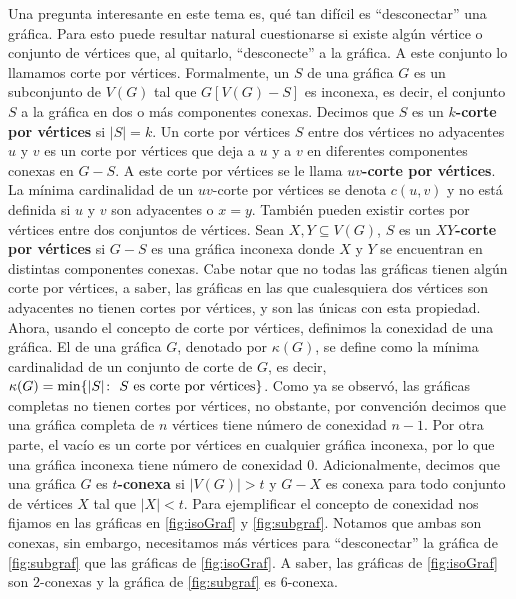 Una pregunta interesante en este tema es, qu\'e tan dif\'icil es ``desconectar''
una gr\'afica. Para esto puede resultar natural cuestionarse si existe alg\'un
v\'ertice o conjunto de v\'ertices que, al quitarlo, ``desconecte'' a la
gr\'afica. A este conjunto lo llamamos corte por v\'ertices. Formalmente, un
 $S$ de una gr\'afica $G$
es un subconjunto de $V(G)$ tal que $G[V(G)-S]$ es inconexa, es decir, el
conjunto $S$  a la gr\'afica en dos o m\'as componentes conexas.
Decimos que $S$ es un $k$\textbf{-corte por v\'ertices} si $|S|=k$. Un corte
por v\'ertices $S$ entre dos v\'ertices no adyacentes $u$ y $v$ es un corte por
v\'ertices que deja a $u$ y a $v$ en diferentes componentes conexas en $G-S$. A
este corte por v\'ertices se le llama $uv$\textbf{-corte por
v\'ertices}. La m\'inima cardinalidad de un $uv$-corte por v\'ertices se denota
$c(u,v)$ y no est\'a definida si $u$ y $v$ son adyacentes o $x=y$. Tambi\'en
pueden existir cortes por v\'ertices entre dos conjuntos de v\'ertices. Sean
$X,Y \subseteq V(G)$, $S$ es un $XY$\textbf{-corte por v\'ertices} si $G-S$ es una
gr\'afica inconexa donde $X$ y $Y$ se encuentran en distintas componentes
conexas. Cabe notar que no todas las gr\'aficas tienen alg\'un corte por
v\'ertices, a saber, las gr\'aficas en las que cualesquiera dos v\'ertices son
adyacentes no tienen cortes por v\'ertices, y son las \'unicas con esta
propiedad. Ahora, usando el concepto de corte por v\'ertices, definimos la
conexidad de una gr\'afica. El  de una gr\'afica
$G$, denotado por $\kappa(G)$, se define como la m\'inima cardinalidad de un
conjunto de corte de $G$, es decir, $\kappa(G)=\min \{|S| \colon\ S \textnormal{
es corte por v\'ertices}\}$. Como ya se observ\'o, las gr\'aficas completas no
tienen cortes por v\'ertices, no obstante, por convenci\'on decimos que una
gr\'afica completa de $n$ v\'ertices tiene n\'umero de conexidad $n-1$. Por otra
parte, el vac\'io es un corte por v\'ertices en cualquier gr\'afica inconexa,
por lo que una gr\'afica inconexa tiene n\'umero de conexidad $0$.
Adicionalmente, decimos que una gr\'afica $G$ es $t$\textbf{-conexa}
 si $|V(G)|>t$ y $G-X$ es conexa para todo
conjunto de v\'ertices $X$ tal que $|X|<t$. Para ejemplificar el concepto de
conexidad nos fijamos en las gr\'aficas en \cref{fig:isoGraf} y
\cref{fig:subgraf}. Notamos que ambas son conexas, sin embargo, necesitamos
m\'as v\'ertices para ``desconectar'' la gr\'afica de \cref{fig:subgraf} que las
gr\'aficas de \cref{fig:isoGraf}. A saber, las gr\'aficas de \cref{fig:isoGraf}
son $2$-conexas y la gr\'afica de \cref{fig:subgraf} es $6$-conexa.

